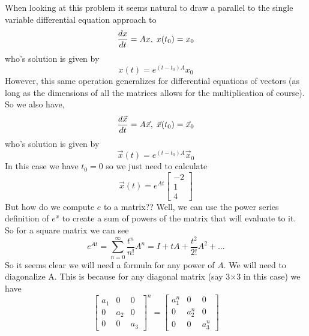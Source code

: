\documentclass{article}
\begin{document}
When looking at this problem it seems natural to draw a parallel to the single variable differential equation approach to
\begin{equation*}
    \frac{dx}{dt}=Ax, \hspace{0.1cm}x(t_0)=x_0
\end{equation*} who's solution is given by
\begin{equation*}
    x(t)=e^{(t-t_0)A}x_0
\end{equation*}
However, this same operation generalizes for differential equations of vectors (as long as the dimensions of all the matrices allows for the multiplication of course). So we also have, 
\begin{equation*}
    \frac{d\vec{x}}{dt}=A\vec{x},\hspace{0.1cm} \vec{x}(t_0)=\vec{x}_0
\end{equation*} who's solution is given by
\begin{equation*}
    \vec{x}(t)=e^{(t-t_0)A}\vec{x}_0
\end{equation*}
In this case we have $t_0=0$ so we just need to calculate
\begin{equation*}
   \vec{x}(t)=e^{At}\begin{bmatrix}
-2 \\
1  \\
4 
\end{bmatrix}
\end{equation*}
But how do we compute $e$ to a matrix?? Well, we can use the power series definition of $e^x$ to create a sum of powers of the matrix that will evaluate to it. So for a square matrix we can see
\begin{equation*}
    e^{At}=\sum_{n=0}^{\infty} \frac{t^n}{n!}A^n=I+tA+\frac{t^2}{2!}A^2+...
\end{equation*} \newpage
So it seems clear we will need a formula for any power of $A$. We will need to diagonalize A. This is because for any diagonal matrix (say 3$\times$3 in this case) we have 
\begin{equation*}
    \begin{bmatrix}
a_1 & 0 & 0\\
0 & a_2 & 0 \\
0 & 0 & a_3
\end{bmatrix}^n=  \begin{bmatrix}
a_1^n & 0 & 0\\
0 & a_2^n & 0 \\
0 & 0 & a_3^n
\end{bmatrix}
\end{equation*}
\end{document}
